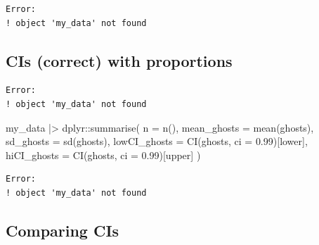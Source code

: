\documentclass[
  letterpaper,
  DIV=11,
  numbers=noendperiod]{scrartcl}
\newenvironment{Shaded}{\begin{snugshade}}{\end{snugshade}}
\newcommand{\AttributeTok}[1]{\textcolor[rgb]{0.40,0.45,0.13}{#1}}
\newcommand{\CommentTok}[1]{\textcolor[rgb]{0.37,0.37,0.37}{#1}}
\newcommand{\DecValTok}[1]{\textcolor[rgb]{0.68,0.00,0.00}{#1}}
\newcommand{\FloatTok}[1]{\textcolor[rgb]{0.68,0.00,0.00}{#1}}
\newcommand{\FunctionTok}[1]{\textcolor[rgb]{0.28,0.35,0.67}{#1}}
\newcommand{\NormalTok}[1]{\textcolor[rgb]{0.00,0.23,0.31}{#1}}
\newcommand{\OtherTok}[1]{\textcolor[rgb]{0.00,0.23,0.31}{#1}}
\newcommand{\SpecialCharTok}[1]{\textcolor[rgb]{0.37,0.37,0.37}{#1}}
\newcommand{\StringTok}[1]{\textcolor[rgb]{0.13,0.47,0.30}{#1}}
\begin{document}
\begin{verbatim}
Error:
! object 'my_data' not found
\end{verbatim}

\subsection{CIs (correct) with
proportions}\label{cis-correct-with-proportions}

\begin{Shaded}
\end{Shaded}

\begin{verbatim}
Error:
! object 'my_data' not found
\end{verbatim}

\begin{Shaded}
\begin{Highlighting}[]
\NormalTok{my\_data }\SpecialCharTok{|\textgreater{}}
\NormalTok{  dplyr}\SpecialCharTok{::}\FunctionTok{summarise}\NormalTok{(}
    \AttributeTok{n =} \FunctionTok{n}\NormalTok{(),}
    \AttributeTok{mean\_ghosts =} \FunctionTok{mean}\NormalTok{(ghosts),}
    \AttributeTok{sd\_ghosts =} \FunctionTok{sd}\NormalTok{(ghosts),}
    \AttributeTok{lowCI\_ghosts =} \FunctionTok{CI}\NormalTok{(ghosts, }\AttributeTok{ci =} \FloatTok{0.99}\NormalTok{)[}\StringTok{\textquotesingle{}lower\textquotesingle{}}\NormalTok{],}
    \AttributeTok{hiCI\_ghosts  =} \FunctionTok{CI}\NormalTok{(ghosts, }\AttributeTok{ci =} \FloatTok{0.99}\NormalTok{)[}\StringTok{\textquotesingle{}upper\textquotesingle{}}\NormalTok{]}
\NormalTok{    )}
\end{Highlighting}
\end{Shaded}

\begin{verbatim}
Error:
! object 'my_data' not found
\end{verbatim}

\subsection{Comparing CIs}\label{comparing-cis}
\end{document}
